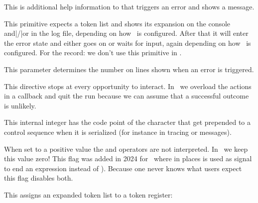 \startoldprimitive[title={\prm {errhelp}}]

This is additional help information to  that triggers an error
and shows a message.

\stopoldprimitive

\startoldprimitive[title={\prm {errmessage}}]

This primitive expects a token list and shows its expansion on the console
and|/|or in the log file, depending on how \TEX\ is configured. After that it
will enter the error state and either goes on or waits for input, again depending
on how \TEX\ is configured. For the record: we don't use this primitive in
\CONTEXT.

\stopoldprimitive

\startoldprimitive[title={\prm {errorcontextlines}}]

This parameter determines the number on lines shown when an error is triggered.

\stopoldprimitive

\startoldprimitive[title={\prm {errorstopmode}}]

This directive stops at every opportunity to interact. In \CONTEXT\ we overload
the actions in a callback and quit the run because we can assume that a
successful outcome is unlikely.

\stopoldprimitive

\startoldprimitive[title={\prm {escapechar}}]

This internal integer has the code point of the character that get prepended to a
control sequence when it is serialized (for instance in tracing or messages).

\stopoldprimitive

\startnewprimitive[title={\prm {etexexprmode}}]

When set to a positive value the \type {:} and \type {;} operators are not
interpreted. In \CONTEXT\ we keep this value zero! This flag was added in 2024
for \LATEX\ where in places \type {;} is used as signal to end an expression
instead of \type {\relax}). Because one never knows what users expect this flag
disables both.

\stopnewprimitive

\startnewprimitive[title={\prm {etoks}}]

This assigns an expanded token list to a token register:

\starttyping
\def\temp{less stuff}
\etoks\scratchtoks{a bit \temp}
\stoptyping

